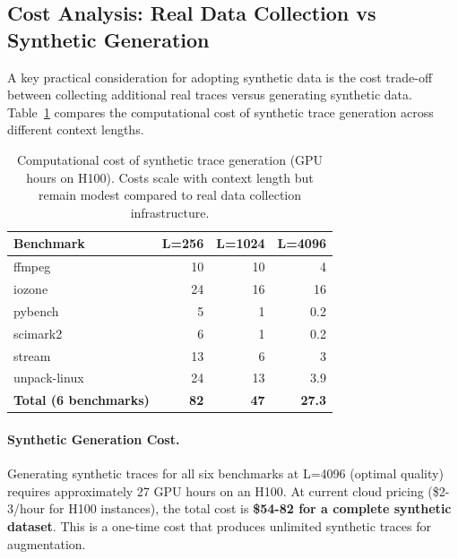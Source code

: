 \subsection{Cost Analysis: Real Data Collection vs Synthetic Generation}
\label{subsec:cost-analysis}

A key practical consideration for adopting synthetic data is the cost trade-off between collecting additional real traces versus generating synthetic data. Table~\ref{tab:cost-comparison} compares the computational cost of synthetic trace generation across different context lengths.

\begin{table}[t]
\centering
\caption{Computational cost of synthetic trace generation (GPU hours on H100). Costs scale with context length but remain modest compared to real data collection infrastructure.}
\label{tab:cost-comparison}
\small
\begin{tabular}{lrrr}
\toprule
\textbf{Benchmark} & \textbf{L=256} & \textbf{L=1024} & \textbf{L=4096} \\
\midrule
ffmpeg & 10 & 10 & 4 \\
iozone & 24 & 16 & 16 \\
pybench & 5 & 1 & 0.2 \\
scimark2 & 6 & 1 & 0.2 \\
stream & 13 & 6 & 3 \\
unpack-linux & 24 & 13 & 3.9 \\
\midrule
\textbf{Total (6 benchmarks)} & \textbf{82} & \textbf{47} & \textbf{27.3} \\
\bottomrule
\end{tabular}
\end{table}

\paragraph{Synthetic Generation Cost.} Generating synthetic traces for all six benchmarks at L=4096 (optimal quality) requires approximately 27 GPU hours on an H100. At current cloud pricing (\$2-3/hour for H100 instances), the total cost is \textbf{\$54-82 for a complete synthetic dataset}. This is a one-time cost that produces unlimited synthetic traces for augmentation.

